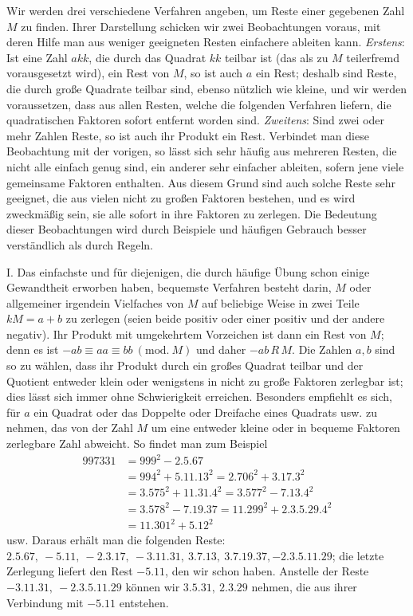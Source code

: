 Wir werden drei verschiedene Verfahren angeben, um Reste einer gegebenen Zahl \(M\) zu finden. Ihrer Darstellung schicken wir zwei Beobachtungen voraus, mit deren Hilfe man aus weniger geeigneten Resten einfachere ableiten kann. \textit{Erstens}: Ist eine Zahl \(akk\), die durch das Quadrat \(kk\) teilbar ist (das als zu \(M\) teilerfremd vorausgesetzt wird), ein Rest von \(M\), so ist auch \(a\) ein Rest; deshalb sind Reste, die durch große
Quadrate teilbar sind, ebenso nützlich wie kleine, und wir werden voraussetzen, dass aus allen Resten, welche die folgenden Verfahren liefern, die quadratischen Faktoren sofort entfernt worden sind. \textit{Zweitens}: Sind zwei oder mehr Zahlen Reste, so ist auch ihr Produkt ein Rest. Verbindet man diese Beobachtung mit der vorigen, so lässt sich sehr häufig aus mehreren Resten, die nicht alle einfach genug sind, ein anderer sehr einfacher ableiten, sofern jene viele gemeinsame Faktoren enthalten. Aus diesem Grund sind auch solche Reste sehr geeignet, die aus vielen nicht zu großen Faktoren bestehen, und es wird zweckmäßig sein, sie alle sofort in ihre Faktoren zu zerlegen. Die Bedeutung dieser Beobachtungen wird durch Beispiele und häufigen Gebrauch besser verständlich als durch Regeln.

I. Das einfachste und für diejenigen, die durch häufige Übung schon einige Gewandtheit erworben haben, bequemste Verfahren besteht darin, \(M\) oder allgemeiner irgendein Vielfaches von \(M\) auf beliebige Weise in zwei Teile \(kM=a+b\) zu zerlegen (seien beide positiv oder einer positiv und der andere negativ). Ihr Produkt mit umgekehrtem Vorzeichen ist dann ein Rest von \(M\); denn es ist \(-ab\equiv aa\equiv bb\ (\mathrm{mod.}\ M)\) und daher \(-ab\,R\,M\). Die Zahlen \(a,\allowbreak b\) sind so zu wählen, dass ihr Produkt durch ein großes Quadrat teilbar und der Quotient entweder klein oder wenigstens in nicht zu große Faktoren zerlegbar ist; dies lässt sich immer ohne Schwierigkeit erreichen. Besonders empfiehlt es sich, für \(a\) ein Quadrat oder das Doppelte oder Dreifache eines Quadrats usw. zu nehmen, das von der Zahl \(M\) um eine entweder kleine oder in bequeme Faktoren zerlegbare Zahl abweicht. So findet man zum Beispiel \[\begin{aligned}
997331&=999^2-2.5.67\\
&=994^2+5.11.13^2=2.706^2+3.17.3^2\\
&=3.575^2+11.31.4^2=3.577^2-7.13.4^2\\
&=3.578^2-7.19.37=11.299^2+2.3.5.29.4^2\\
&=11.301^2+5.12^2
\end{aligned}\] usw. Daraus erhält man die folgenden Reste: \(2.5.67,\allowbreak \ -5.11,\allowbreak \ -2.3.17,\allowbreak \ -3.11.31,\allowbreak \ 3.7.13,\allowbreak \ 3.7.19.37,\allowbreak -2.3.5.11.29\); die letzte Zerlegung liefert den Rest \(-5.11\), den wir schon haben. Anstelle der Reste \(-3.11.31,\allowbreak \ -2.3.5.11.29\) können wir \(3.5.31,\allowbreak \ 2.3.29\) nehmen, die aus ihrer Verbindung mit \(-5.11\) entstehen.

